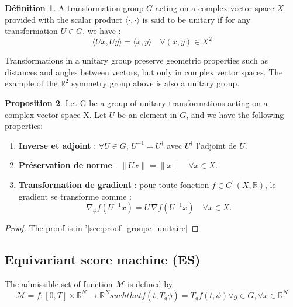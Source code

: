 \documentclass[a4paper,10pt]{article}
\theoremstyle{definition} %
\newtheorem{definition}{Définition}[section]
\theoremstyle{definition} %
\newtheorem{proposition}[definition]{Proposition}
\theoremstyle{definition} %
\theoremstyle{definition} %
\newcommand{\R}{\mathbb{R}}
\begin{document}
\begin{definition}
    A transformation group $G$ acting on a complex vector space $X$ provided with the scalar product $\langle \cdot,\cdot \rangle$ is said to be unitary if for any transformation $U \in G$, we have :
    \begin{equation*}
        \langle Ux,Uy\rangle = \langle x,y\rangle \quad\forall(x,y) \in X^2
    \end{equation*}
\end{definition}


Transformations in a unitary group preserve geometric properties such as distances and angles between vectors, but only in complex vector spaces. The example of the $\R^2$ symmetry group above is also a unitary group.
\begin{proposition}\label{prop:Groupe_unitaire}
    Let G be a group of unitary transformations acting on a complex vector space X. Let $U$ be an element in $G$, and we have the following properties:
        \begin{enumerate}[label=(\roman*)]
        \item \textbf{Inverse et adjoint} : $\forall U \in G$, $U^{-1} = U^\dagger$ avec $U^\dagger$ l'adjoint de $U$.
        \item \textbf{Préservation de norme} : $\|Ux\| = \|x\| \quad \forall x\in X$.
        \item \textbf{Transformation de gradient} : pour toute fonction $f \in C^1(X,\R)$, le gradient se transforme comme :
        \begin{equation*}
            \nabla_\phi f(U^{-1}x) = U\, \nabla f(U^{-1}x) \quad \forall x\in X.
        \end{equation*}
    \end{enumerate}
\end{proposition}

\begin{proof}
    The proof is in '\cref{sec:proof_groupe_unitaire}
\end{proof}
\subsection{Equivariant score machine (ES)}
The admissible set of function $\mathcal{M}$ is defined by
\begin{equation*}
    \mathcal{M} = {f:[0,T]\times \R^N} \rightarrow \R^N such that f(t,T_g \phi) = T_g f(t,\phi) \forall g\in G,\forall x\in \R^N
\end{equation*}
\end{document}
